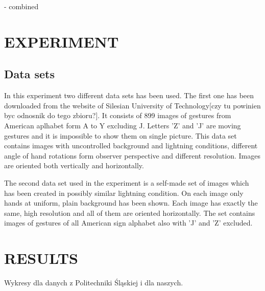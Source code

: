 \documentclass[11pt,a4paper]{article}
\begin{document}
- combined


\section{EXPERIMENT}

\subsection{Data sets}
	In this experiment two different data sets has been used. The first one has been downloaded from the website of Silesian University of Technology[czy tu powinien byc odnosnik do tego zbioru?]. It consists of 899 images of gestures from American aplhabet form A to Y excluding J. Letters 'Z' and 'J' are moving gestures and it is impossible to show them on single picture. This data set contains images with uncontrolled background and lightning conditions, different angle of hand rotations form observer perspective and different resolution. Images are oriented both vertically and horizontally.
	
	The second data set used in the experiment is a self-made set of images which has been created in possibly similar lightning condition. On each image only hands at uniform, plain background has been shown. Each image has exactly the same, high resolution and all of them are oriented horizontally. The set contains images of gestures of all American sign alphabet also with 'J' and 'Z' excluded.



\section{RESULTS}

Wykresy dla danych z Politechniki Śląskiej i dla naszych.


\end{document}
